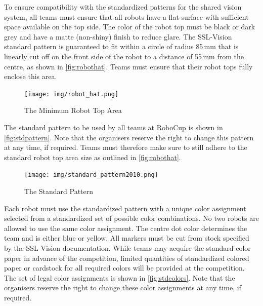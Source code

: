 To ensure compatibility with the standardized patterns for the shared vision system, all teams must ensure that all robots have a flat surface with sufficient space available on the top side.
The color of the robot top must be black or dark grey and have a matte (non-shiny) finish to reduce glare.
The SSL-Vision standard pattern is guaranteed to fit within a circle of radius 85\,mm that is linearly cut off on the front side of the robot to a distance of 55\,mm from the centre, as shown in \autoref{fig:robothat}.
Teams must ensure that their robot tops fully enclose this area.

\begin{figure}[ht] %
	\centering
	\texttt{[image: img/robot\_hat.png]}
	\caption{The Minimum Robot Top Area}
	\label{fig:robothat}
\end{figure}

The standard pattern to be used by all teams at RoboCup is shown in \autoref{fig:stdpattern}.
Note that the organisers reserve the right to change this pattern at any time, if required.
Teams must therefore make sure to still adhere to the standard robot top area size as outlined in \autoref{fig:robothat}.

\begin{figure}[ht] %
	\centering
	\texttt{[image: img/standard\_pattern2010.png]}
	\caption{The Standard Pattern}
	\label{fig:stdpattern}
\end{figure}

Each robot must use the standardized pattern with a unique color assignment
selected from a standardized set of possible color combinations.
No two robots are allowed to use the same color assignment.
The centre dot color determines the team and is either blue or yellow.
All markers must be cut from stock specified by the SSL-Vision
documentation. While teams may acquire the standard color paper in advance of
the competition, limited quantities of standardized colored paper or cardstock for
all required colors will be provided at the competition.
The set of legal color assignments is shown in \autoref{fig:stdcolors}.
Note that the organisers reserve the right to change these color assignments at
any time, if required.

